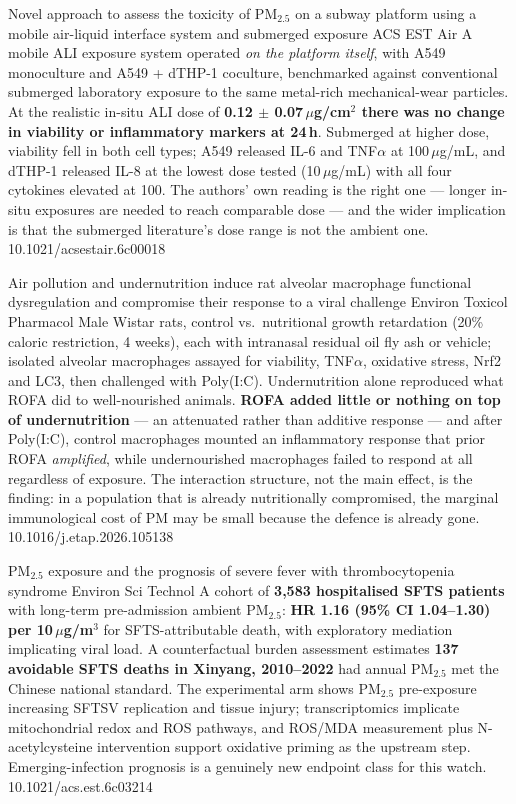 \documentclass[10pt]{article}
\begin{document}

{Novel approach to assess the toxicity of PM$_{2.5}$ on a subway platform using a mobile air-liquid interface system and submerged exposure}
{ACS EST Air}
{A mobile ALI exposure system operated \emph{on the platform itself}, with A549
monoculture and A549 + dTHP-1 coculture, benchmarked against conventional submerged
laboratory exposure to the same metal-rich mechanical-wear particles. At the realistic
in-situ ALI dose of \textbf{0.12 $\pm$ 0.07\,$\mu$g/cm$^2$ there was no change in
viability or inflammatory markers at 24\,h}. Submerged at higher dose, viability fell in
both cell types; A549 released IL-6 and TNF$\alpha$ at 100\,$\mu$g/mL, and dTHP-1
released IL-8 at the lowest dose tested (10\,$\mu$g/mL) with all four cytokines elevated
at 100. The authors' own reading is the right one --- longer in-situ exposures are needed
to reach comparable dose --- and the wider implication is that the submerged literature's
dose range is not the ambient one.}
{10.1021/acsestair.6c00018}

{Air pollution and undernutrition induce rat alveolar macrophage functional dysregulation and compromise their response to a viral challenge}
{Environ Toxicol Pharmacol}
{Male Wistar rats, control vs.\ nutritional growth retardation (20\% caloric restriction,
4 weeks), each with intranasal residual oil fly ash or vehicle; isolated alveolar
macrophages assayed for viability, TNF$\alpha$, oxidative stress, Nrf2 and LC3, then
challenged with Poly(I:C). Undernutrition alone reproduced what ROFA did to well-nourished
animals. \textbf{ROFA added little or nothing on top of undernutrition} --- an attenuated
rather than additive response --- and after Poly(I:C), control macrophages mounted an
inflammatory response that prior ROFA \emph{amplified}, while undernourished macrophages
failed to respond at all regardless of exposure. The interaction structure, not the main
effect, is the finding: in a population that is already nutritionally compromised, the
marginal immunological cost of PM may be small because the defence is already gone.}
{10.1016/j.etap.2026.105138}


{PM$_{2.5}$ exposure and the prognosis of severe fever with thrombocytopenia syndrome}
{Environ Sci Technol}
{A cohort of \textbf{3{,}583 hospitalised SFTS patients} with long-term pre-admission
ambient PM$_{2.5}$: \textbf{HR 1.16 (95\% CI 1.04--1.30) per 10\,$\mu$g/m$^3$} for
SFTS-attributable death, with exploratory mediation implicating viral load. A
counterfactual burden assessment estimates \textbf{137 avoidable SFTS deaths in Xinyang,
2010--2022} had annual PM$_{2.5}$ met the Chinese national standard. The experimental arm
shows PM$_{2.5}$ pre-exposure increasing SFTSV replication and tissue injury;
transcriptomics implicate mitochondrial redox and ROS pathways, and ROS/MDA measurement
plus N-acetylcysteine intervention support oxidative priming as the upstream step.
Emerging-infection prognosis is a genuinely new endpoint class for this watch.}
{10.1021/acs.est.6c03214}
\end{document}
